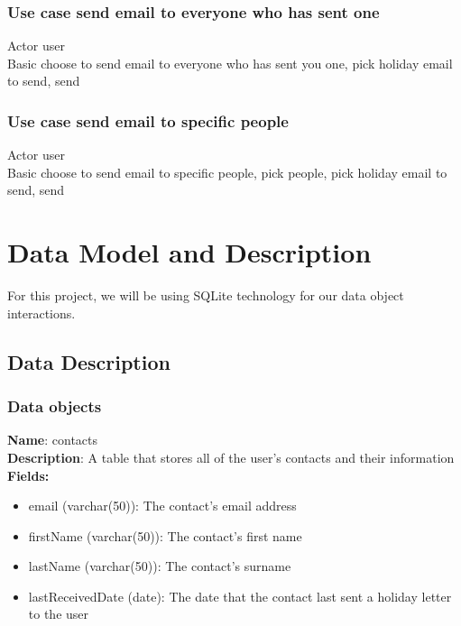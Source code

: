 \documentclass{article}
\begin{document}
\subsubsection*{Use case send email to everyone who has sent one}
Actor user \\
Basic choose to send email to everyone who has sent you one, pick holiday email to send, send \\
 
\subsubsection*{Use case send email to specific people}
Actor user \\
Basic choose to send email to specific people, pick people, pick holiday email to send, send \\


\section{Data Model and Description}
For this project, we will be using SQLite technology for our data object interactions.

\subsection{Data Description}

\subsubsection{Data objects}
\textbf{Name}: contacts \\
\textbf{Description}: A table that stores all of the user's contacts and their information \\
\textbf{Fields:}
\begin{itemize}
\item email (varchar(50)): The contact's email address
\item firstName (varchar(50)): The contact's first name
\item lastName (varchar(50)): The contact's surname
\item lastReceivedDate (date): The date that the contact last sent a holiday letter to the user
\end{itemize}
\end{document}
